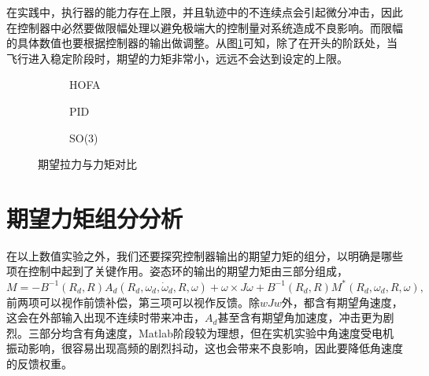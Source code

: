 在实践中，执行器的能力存在上限，并且轨迹中的不连续点会引起微分冲击，因此在控制器中必然要做限幅处理以避免极端大的控制量对系统造成不良影响。而限幅的具体数值也要根据控制器的输出做调整。从图\ref{matlab_fM}可知，除了在开头的阶跃处，当飞行进入稳定阶段时，期望的力矩非常小，远远不会达到设定的上限。
\begin{figure}[!h]
  \centering
  \begin{subfigure}[t]{0.33\textwidth}
    \centering
    \caption{HOFA}
  \end{subfigure}\hfill
  \begin{subfigure}[t]{0.33\textwidth}
    \centering
    \caption{PID}
  \end{subfigure}\hfill
  \begin{subfigure}[t]{0.33\textwidth}
    \centering
    \caption{SO(3)}
  \end{subfigure}
  \caption{期望拉力与力矩对比}
  \label{matlab_fM}
\end{figure}



\section{期望力矩组分分析}
在以上数值实验之外，我们还要探究控制器输出的期望力矩的组分，以明确是哪些项在控制中起到了关键作用。姿态环的输出的期望力矩由三部分组成，
$$M=-B^{-1}(R_d,R) A_d(R_d,\omega_d,\dot \omega_d,R,\omega)+\omega \times J\omega +B^{-1}(R_d,R)M^*(R_d,\omega_d,R,\omega),$$
前两项可以视作前馈补偿，第三项可以视作反馈。除$wJw$外，都含有期望角速度，这会在外部输入出现不连续时带来冲击，$A_d$甚至含有期望角加速度，冲击更为剧烈。三部分均含有角速度，Matlab阶段较为理想，但在实机实验中角速度受电机振动影响，很容易出现高频的剧烈抖动，这也会带来不良影响，因此要降低角速度的反馈权重。

